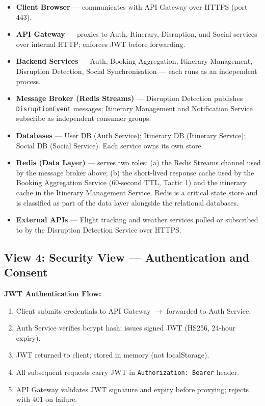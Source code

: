 \documentclass[12pt,a4paper]{article}
\begin{document}
\begin{itemize}[noitemsep]
  \item \textbf{Client Browser} — communicates with API Gateway over HTTPS (port 443).
  \item \textbf{API Gateway} — proxies to Auth, Itinerary, Disruption, and Social services over
        internal HTTP; enforces JWT before forwarding.
  \item \textbf{Backend Services} — Auth, Booking Aggregation, Itinerary Management, Disruption
        Detection, Social Synchronisation — each runs as an independent process.
  \item \textbf{Message Broker (Redis Streams)} — Disruption Detection publishes
        \texttt{DisruptionEvent} messages; Itinerary Management and Notification Service
        subscribe as independent consumer groups.
  \item \textbf{Databases} — User DB (Auth Service); Itinerary DB (Itinerary Service); Social DB
        (Social Service). Each service owns its own store.
  \item \textbf{Redis (Data Layer)} — serves two roles: (a) the Redis Streams channel used by
        the message broker above; (b) the short-lived response cache used by the Booking
        Aggregation Service (60-second TTL, Tactic 1) and the itinerary cache in the Itinerary
        Management Service. Redis is a critical state store and is classified as part of the
        data layer alongside the relational databases.
  \item \textbf{External APIs} — Flight tracking and weather services polled or subscribed to by
        the Disruption Detection Service over HTTPS.
\end{itemize}

\subsection{View 4: Security View — Authentication and Consent}

\textbf{JWT Authentication Flow:}
\begin{enumerate}[noitemsep]
  \item Client submits credentials to API Gateway $\to$ forwarded to Auth Service.
  \item Auth Service verifies bcrypt hash; issues signed JWT (HS256, 24-hour expiry).
  \item JWT returned to client; stored in memory (not localStorage).
  \item All subsequent requests carry JWT in \texttt{Authorization: Bearer} header.
  \item API Gateway validates JWT signature and expiry before proxying; rejects with 401 on
        failure.
\end{enumerate}
\end{document}
